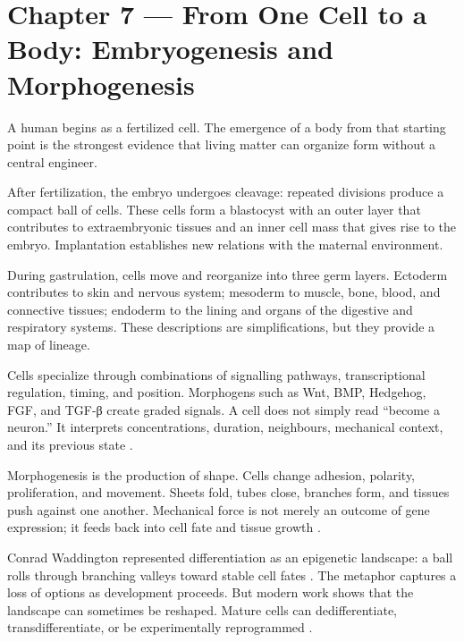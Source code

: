 \chapter{Chapter 7 --- From One Cell to a Body: Embryogenesis and Morphogenesis}\label{chapter-7-from-one-cell-to-a-body-embryogenesis-and-morphogenesis}

A human begins as a fertilized cell. The emergence of a body from that starting point is the strongest evidence that living matter can organize form without a central engineer.

After fertilization, the embryo undergoes cleavage: repeated divisions produce a compact ball of cells. These cells form a blastocyst with an outer layer that contributes to extraembryonic tissues and an inner cell mass that gives rise to the embryo. Implantation establishes new relations with the maternal environment.

During gastrulation, cells move and reorganize into three germ layers. Ectoderm contributes to skin and nervous system; mesoderm to muscle, bone, blood, and connective tissues; endoderm to the lining and organs of the digestive and respiratory systems. These descriptions are simplifications, but they provide a map of lineage.

Cells specialize through combinations of signalling pathways, transcriptional regulation, timing, and position. Morphogens such as Wnt, BMP, Hedgehog, FGF, and TGF-β create graded signals. A cell does not simply read ``become a neuron.'' It interprets concentrations, duration, neighbours, mechanical context, and its previous state \autocite{basson2012signaling}.

Morphogenesis is the production of shape. Cells change adhesion, polarity, proliferation, and movement. Sheets fold, tubes close, branches form, and tissues push against one another. Mechanical force is not merely an outcome of gene expression; it feeds back into cell fate and tissue growth \autocite{shahbazi2020human,sutlive2021mechanical}.

Conrad Waddington represented differentiation as an epigenetic landscape: a ball rolls through branching valleys toward stable cell fates \autocite{waddington1957strategy}. The metaphor captures a loss of options as development proceeds. But modern work shows that the landscape can sometimes be reshaped. Mature cells can dedifferentiate, transdifferentiate, or be experimentally reprogrammed \autocite{merrell2016plasticity,yamanaka2010nuclear}.

